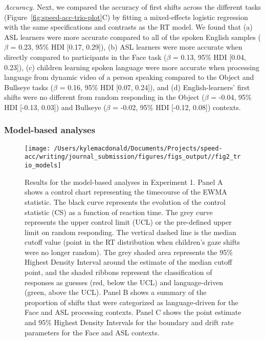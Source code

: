 \documentclass[,man,floatsintext]{apa6}
\begin{document}
\emph{Accuracy.} Next, we compared the accuracy of first shifts across
the different tasks (Figure~\ref{fig:speed-acc-trio-plot}C) by fitting a
mixed-effects logistic regression with the same specifications and
contrasts as the RT model. We found that (a) ASL learners were more
accurate compared to all of the spoken English samples (\(\beta\) =
0.23, 95\% HDI {[}0.17, 0.29{]}), (b) ASL learners were more accurate
when directly compared to participants in the Face task (\(\beta\) =
0.13, 95\% HDI {[}0.04, 0.23{]}), (c) children learning spoken language
were more accurate when processing language from dynamic video of a
person speaking compared to the Object and Bullseye tasks (\(\beta\) =
0.16, 95\% HDI {[}0.07, 0.24{]}), and (d) English-learners' first shifts
were no different from random responding in the Object (\(\beta\) =
-0.04, 95\% HDI {[}-0.13, 0.03{]}) and Bullseye (\(\beta\) = -0.02, 95\%
HDI {[}-0.12, 0.08{]}) contexts.

\hypertarget{model-based-analyses}{%
\subsubsection{Model-based analyses}\label{model-based-analyses}}

\begin{figure}[!t]

{\centering \texttt{[image: /Users/kylemacdonald/Documents/Projects/speed-acc/writing/journal\_submission/figures/figs\_output//fig2\_trio\_models]} 

}

\caption{Results for the model-based analyses in Experiment 1. Panel A shows a control chart representing the timecourse of the EWMA statistic. The black curve represents the evolution of the control statistic (CS) as a function of reaction time. The grey curve represents the upper control limit (UCL) or the pre-defined upper limit on random responding. The vertical dashed line is the median cutoff value (point in the RT distribution when children's gaze shifts were no longer random). The grey shaded area represents the 95\% Highest Density Interval around the estimate of the median cutoff point, and the shaded ribbons represent the classification of responses as guesses (red, below the UCL) and language-driven (green, above the UCL). Panel B shows a summary of the proportion of shifts that were categorized as language-driven for the Face and ASL processing contexts. Panel C shows the point estimate and 95\% Highest Density Intervals for the boundary and drift rate parameters for the Face and ASL contexts.}\label{fig:trio-model-plot}
\end{figure}
\end{document}
